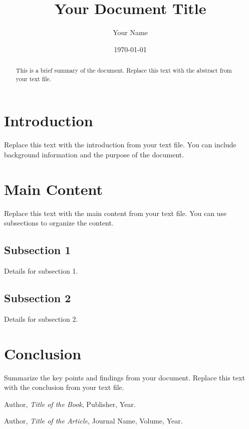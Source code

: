 \documentclass{article}
\title{Your Document Title}
\author{Your Name}
\date{\today}
\begin{document}
\maketitle

\begin{abstract}
This is a brief summary of the document. Replace this text with the abstract from your text file.
\end{abstract}

\section{Introduction}
Replace this text with the introduction from your text file. You can include background information and the purpose of the document.

\section{Main Content}
Replace this text with the main content from your text file. You can use subsections to organize the content.

\subsection{Subsection 1}
Details for subsection 1.

\subsection{Subsection 2}
Details for subsection 2.

\section{Conclusion}
Summarize the key points and findings from your document. Replace this text with the conclusion from your text file.

\begin{thebibliography}{9}
Author, \textit{Title of the Book}, Publisher, Year.

Author, \textit{Title of the Article}, Journal Name, Volume, Year.
\end{thebibliography}
\end{document}
